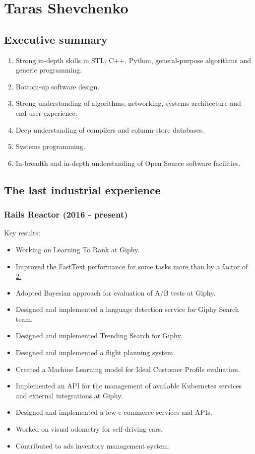 \documentclass[a4paper,12pt,final]{extreport}
\begin{document}
\section{Taras Shevchenko}
\subsection{Executive summary}
\begin{enumerate}
  \item Strong in-depth skills in STL, C++, Python, general-purpose algorithms and generic programming.
  \item Bottom-up software design.
  \item Strong understanding of algorithms, networking, systems architecture and end-user experience.
  \item Deep understanding of compilers and column-store databases.
  \item Systems programming.
  \item In-breadth and in-depth understanding of Open Source software facilities.
\end{enumerate}

\subsection{The last industrial experience} \subsubsection{Rails Reactor (2016 - present)}
Key results:
\begin{itemize}
  \item Working on Learning To Rank at Giphy.
  \item \href{https://engineering.giphy.com/how-we-made-fasttext-faster/}{Improved the FastText performance for some tasks more than by a factor of 2.}
  \item Adopted Bayesian approach for evaluation of A/B tests at Giphy.
  \item Designed and implemented a language detection service for Giphy Search team.
  \item Designed and implemented Trending Search for Giphy.
  \item Designed and implemented a flight planning system.
  \item Created a Machine Learning model for Ideal Customer Profile evaluation.
  \item Implemented an API for the management of available Kubernetes services and external integrations at Giphy.
  \item Designed and implemented a few e-commerce services and APIs.
  \item Worked on visual odometry for self-driving cars.  
  \item Contributed to ads inventory management system.
\end{itemize}
\end{document}
